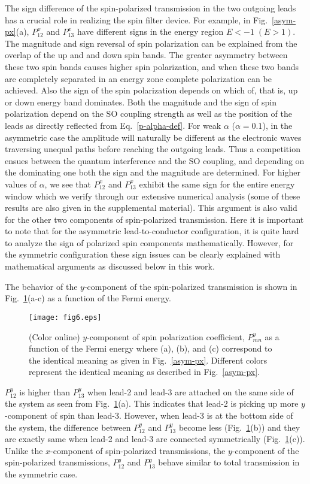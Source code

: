 \documentclass[prb,aps,twocolumn,amsmath,amssymb,floatfix,
superscriptaddress]{revtex4}
\begin{document}
The sign difference of the spin-polarized transmission in the two
  outgoing leads has a crucial role in realizing the spin filter
  device. For example, in Fig.~{\ref{asym-px}(a)}, $P^x_{12}$ and
  $P^x_{13}$ have different signs in the energy region
  $E<-1\;(E>1)$. The magnitude and sign reversal of spin
polarization can be explained from the overlap of the up and and down spin bands. The greater asymmetry between
these two spin bands causes higher spin polarization, and when these two bands are completely separated in an energy zone complete polarization can be achieved. Also the
sign of the spin polarization depends on which of, that is, up or down energy band dominates. Both the magnitude and the sign of spin polarization
depend on the SO coupling strength as well as the position of the leads as directly reflected from Eq.~{\ref{p-alpha-def}}. For weak $\alpha$ ($\alpha=0.1$), in the asymmetric case the amplitude will naturally be different as the electronic waves traversing unequal paths before reaching the outgoing leads. Thus a competition ensues between the quantum interference and the SO coupling, and
depending on the dominating one both the sign and the magnitude are
determined. For higher values of $\alpha$, we see that $P_{12}^x$ and $P_{13}^x$ exhibit the same sign for the entire energy window which we verify through our extensive numerical analysis (some of these results are also given in the supplemental material). This argument is also valid for the other two components of spin-polarized transmission. Here it is important to note that for the asymmetric lead-to-conductor configuration, it is quite hard to analyze the sign of polarized spin components
mathematically. However, for the symmetric configuration these sign issues can be clearly explained with mathematical arguments as discussed below in this work.

The behavior of the $y$-component of the spin-polarized transmission
is shown in Fig.~\ref{asym-py}(a-c) as a function of the Fermi energy.
\begin{figure}[h]
\centering
\texttt{[image: fig6.eps]}
\caption{(Color online) $y$-component of spin polarization
  coefficient, $P^y_{mn}$ as a function of the Fermi energy where (a),
  (b), and (c) correspond to the identical meaning as given in
  Fig.~\ref{asym-px}. Different colors represent the identical meaning
  as described in Fig.~\ref{asym-px}.}
\label{asym-py}
\end{figure}
$P^y_{12}$ is higher than $P^y_{13}$ when lead-2 and lead-3 are
attached on the same side of the system as seen from
Fig.~\ref{asym-py}(a). This indicates that lead-2 is picking up more
$y$-component of spin than lead-3. However, when lead-3 is at the
bottom side of the system, the difference between $P^y_{12}$ and
$P^y_{13}$ become less (Fig.~\ref{asym-py}(b)) and they are exactly
same when lead-2 and lead-3 are connected symmetrically
(Fig.~\ref{asym-py}(c)). Unlike the $x$-component of spin-polarized
transmissions, the $y$-component of the spin-polarized transmissions,
$P^y_{12}$ and $P^y_{13}$ behave similar to total transmission in the
symmetric case.
\end{document}
